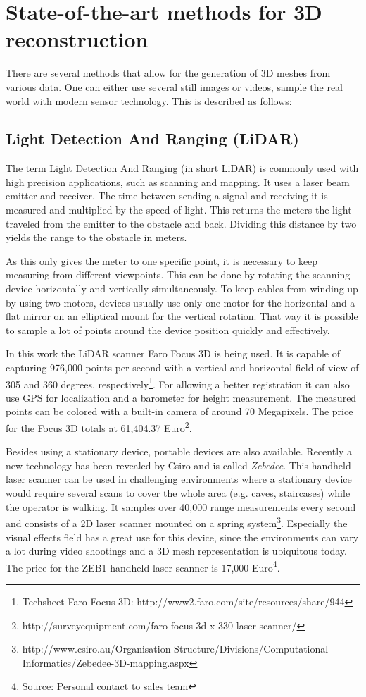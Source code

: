 \section{State-of-the-art methods for 3D reconstruction}

There are several methods that allow for the generation of 3D meshes from various data. One can either use several still images or videos, sample the real world with modern sensor technology. This is described as follows:

\subsection{Light Detection And Ranging (LiDAR)}

The term Light Detection And Ranging (in short LiDAR) is commonly used with high precision applications, such as scanning and mapping. It uses a laser beam emitter and receiver. The time between sending a signal and receiving it is measured and multiplied by the speed of light. This returns the meters the light traveled from the emitter to the obstacle and back. Dividing this distance by two yields the range to the obstacle in meters.\parencite[see][p8-9]{dp_lidar}

As this only gives the meter to one specific point, it is necessary to keep measuring from different viewpoints. This can be done by rotating the scanning device horizontally and vertically simultaneously. To keep cables from winding up by using two motors, devices usually use only one motor for the horizontal and a flat mirror on an elliptical mount for the vertical rotation. That way it is possible to sample a lot of points around the device position quickly and effectively.

In this work the LiDAR scanner Faro Focus 3D is being used. It is capable of capturing 976,000 points per second with a vertical and horizontal field of view of 305 and 360 degrees, respectively\footnote{Techsheet Faro Focus 3D: http://www2.faro.com/site/resources/share/944}. For allowing a better registration it can also use GPS for localization and a barometer for height measurement. The measured points can be colored with a built-in camera of around 70 Megapixels. The price for the Focus 3D totals at 61,404.37 Euro\footnote{http://surveyequipment.com/faro-focus-3d-x-330-laser-scanner/}.

Besides using a stationary device, portable devices are also available. Recently a new technology has been revealed by Csiro and is called \textit{Zebedee}. This handheld laser scanner can be used in challenging environments where a stationary device would require several scans to cover the whole area (e.g. caves, staircases) while the operator is walking. It samples over 40,000 range measurements every second and consists of a 2D laser scanner mounted on a spring system\footnote{http://www.csiro.au/Organisation-Structure/Divisions/Computational-Informatics/Zebedee-3D-mapping.aspx}. Especially the visual effects field has a great use for this device, since the environments can vary a lot during video shootings and a 3D mesh representation is ubiquitous today. The price for the ZEB1 handheld laser scanner is 17,000 Euro\footnote{Source: Personal contact to sales team}.

